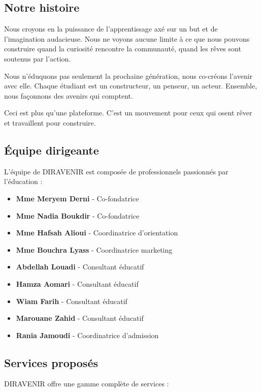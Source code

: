 \documentclass[12pt,a4paper]{report}
\begin{document}
\subsection{Notre histoire}

Nous croyons en la puissance de l'apprentissage axé sur un but et de l'imagination audacieuse. Nous ne voyons aucune limite à ce que nous pouvons construire quand la curiosité rencontre la communauté, quand les rêves sont soutenus par l'action.

Nous n'éduquons pas seulement la prochaine génération, nous co-créons l'avenir avec elle. Chaque étudiant est un constructeur, un penseur, un acteur. Ensemble, nous façonnons des avenirs qui comptent.

Ceci est plus qu'une plateforme. C'est un mouvement pour ceux qui osent rêver et travaillent pour construire.

\subsection{Équipe dirigeante}

L'équipe de DIRAVENIR est composée de professionnels passionnés par l'éducation :

\begin{itemize}
    \item \textbf{Mme Meryem Derni} - Co-fondatrice
    \item \textbf{Mme Nadia Boukdir} - Co-fondatrice  
    \item \textbf{Mme Hafsah Alioui} - Coordinatrice d'orientation
    \item \textbf{Mme Bouchra Lyass} - Coordinatrice marketing
    \item \textbf{Abdellah Louadi} - Consultant éducatif
    \item \textbf{Hamza Aomari} - Consultant éducatif
    \item \textbf{Wiam Farih} - Consultant éducatif
    \item \textbf{Marouane Zahid} - Consultant éducatif
    \item \textbf{Rania Jamoudi} - Coordinatrice d'admission
\end{itemize}

\subsection{Services proposés}

DIRAVENIR offre une gamme complète de services :
\end{document}
